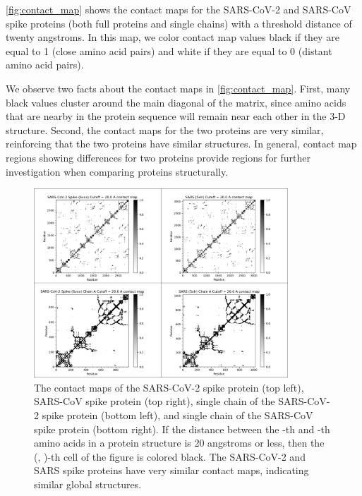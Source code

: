 \autoref{fig:contact_map} shows the contact maps for the SARS-CoV-2 and SARS-CoV spike proteins (both full proteins and single chains) with a threshold distance of twenty angstroms. In this map, we color contact map values black if they are equal to 1 (close amino acid pairs) and white if they are equal to 0 (distant amino acid pairs).\\

\begin{note}\end{note}

We observe two facts about the contact maps in \autoref{fig:contact_map}. First, many black values cluster around the main diagonal of the matrix, since amino acids that are nearby in the protein sequence will remain near each other in the 3-D structure. Second, the contact maps for the two proteins are very similar, reinforcing that the two proteins have similar structures. In general, contact map regions showing differences for two proteins provide regions for further investigation when comparing proteins structurally.\\

\begin{figure}[h]
	\centering
	\mySfFamily
	\includegraphics[width = 0.85\textwidth]{../images/Contact.png}
	\caption{The contact maps of the SARS-CoV-2 spike protein (top left), SARS-CoV spike protein (top right), single chain of the SARS-CoV-2 spike protein (bottom left), and single chain of the SARS-CoV spike protein (bottom right). If the distance between the -th and -th amino acids in a protein structure is 20 angstroms or less, then the (, )-th cell of the figure is colored black. The SARS-CoV-2 and SARS spike proteins have very similar contact maps, indicating similar global structures.}
	\label{fig:contact_map}
\end{figure}

